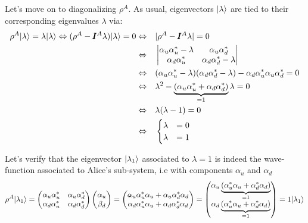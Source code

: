 \documentclass[solutions.tex]{subfiles}
\begin{document}
Let's move on to diagonalizing $\rho^A$. As usual, eigenvectors $|\lambda\rangle$
are tied to their corresponding eigenvalues $\lambda$ via:
\begin{equation*}\begin{aligned}
	\rho^A|\lambda\rangle = \lambda|\lambda\rangle
	\Leftrightarrow
	(\rho^A-\pmb{I}^A\lambda)|\lambda\rangle = 0
	&\Leftrightarrow&&
	|\rho^A-\pmb{I}^A\lambda| = 0 \\
	~&\Leftrightarrow&&
	\begin{vmatrix}
		\alpha_u\alpha_u^*-\lambda & \alpha_u\alpha_d^* \\
		\alpha_d\alpha_u^* & \alpha_d\alpha_d^*-\lambda \\
	\end{vmatrix} \\
	~&\Leftrightarrow&&
	(\alpha_u\alpha_u^*-\lambda)(\alpha_d\alpha_d^*-\lambda)
	-\alpha_d\alpha_u^*\alpha_u\alpha_d^* = 0\\
	~&\Leftrightarrow&&
	\lambda^2-\underbrace{(\alpha_u\alpha_u^*+\alpha_d\alpha_d^*)}_{=1}\lambda = 0 \\
	~&\Leftrightarrow&&
	\lambda(\lambda-1) = 0 \\
	~&\Leftrightarrow&&
	\begin{cases}
		\lambda &= 0 \\
		\lambda &= 1 \\
	\end{cases}
\end{aligned}\end{equation*}

Let's verify that the eigenvector $|\lambda_1\rangle$ associated to $\lambda=1$
is indeed the wave-function associated to Alice's sub-system, i.e with
components $\alpha_u$ and $\alpha_d$
\[
	\rho^A|\lambda_1\rangle = \begin{pmatrix}
		\alpha_u\alpha_u^* & \alpha_u\alpha_d^* \\
		\alpha_d\alpha_u^* & \alpha_d\alpha_d^* \\
	\end{pmatrix}\begin{pmatrix}
		\alpha_u \\
		\beta_d \\
	\end{pmatrix} = \begin{pmatrix}
		\alpha_u\alpha_u^*\alpha_u + \alpha_u\alpha_d^*\alpha_d \\
		\alpha_d\alpha_u^*\alpha_u + \alpha_d\alpha_d^*\alpha_d \\
	\end{pmatrix} = \begin{pmatrix}
		\alpha_u\underbrace{(\alpha_u^*\alpha_u+\alpha_d^*\alpha_d)}_{=1} \\
		\alpha_d\underbrace{(\alpha_u^*\alpha_u+\alpha_d^*\alpha_d)}_{=1} \\
	\end{pmatrix} = 1|\lambda_1\rangle
\]
\end{document}
